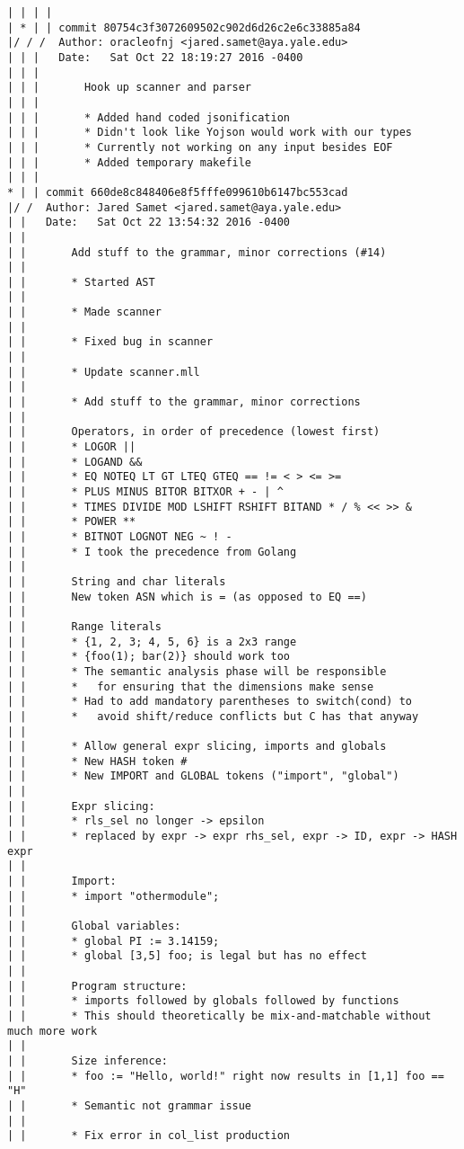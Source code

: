 \begin{lstlisting}
| | | |     
| * | | commit 80754c3f3072609502c902d6d26c2e6c33885a84
|/ / /  Author: oracleofnj <jared.samet@aya.yale.edu>
| | |   Date:   Sat Oct 22 18:19:27 2016 -0400
| | |   
| | |       Hook up scanner and parser
| | |       
| | |       * Added hand coded jsonification
| | |       * Didn't look like Yojson would work with our types
| | |       * Currently not working on any input besides EOF
| | |       * Added temporary makefile
| | |    
* | | commit 660de8c848406e8f5fffe099610b6147bc553cad
|/ /  Author: Jared Samet <jared.samet@aya.yale.edu>
| |   Date:   Sat Oct 22 13:54:32 2016 -0400
| |   
| |       Add stuff to the grammar, minor corrections (#14)
| |       
| |       * Started AST
| |       
| |       * Made scanner
| |       
| |       * Fixed bug in scanner
| |       
| |       * Update scanner.mll
| |       
| |       * Add stuff to the grammar, minor corrections
| |       
| |       Operators, in order of precedence (lowest first)
| |       * LOGOR ||
| |       * LOGAND &&
| |       * EQ NOTEQ LT GT LTEQ GTEQ == != < > <= >=
| |       * PLUS MINUS BITOR BITXOR + - | ^
| |       * TIMES DIVIDE MOD LSHIFT RSHIFT BITAND * / % << >> &
| |       * POWER **
| |       * BITNOT LOGNOT NEG ~ ! -
| |       * I took the precedence from Golang
| |       
| |       String and char literals
| |       New token ASN which is = (as opposed to EQ ==)
| |       
| |       Range literals
| |       * {1, 2, 3; 4, 5, 6} is a 2x3 range
| |       * {foo(1); bar(2)} should work too
| |       * The semantic analysis phase will be responsible
| |       *   for ensuring that the dimensions make sense
| |       * Had to add mandatory parentheses to switch(cond) to
| |       *   avoid shift/reduce conflicts but C has that anyway
| |       
| |       * Allow general expr slicing, imports and globals
| |       * New HASH token #
| |       * New IMPORT and GLOBAL tokens ("import", "global")
| |       
| |       Expr slicing:
| |       * rls_sel no longer -> epsilon
| |       * replaced by expr -> expr rhs_sel, expr -> ID, expr -> HASH expr
| |       
| |       Import:
| |       * import "othermodule";
| |       
| |       Global variables:
| |       * global PI := 3.14159;
| |       * global [3,5] foo; is legal but has no effect
| |       
| |       Program structure:
| |       * imports followed by globals followed by functions
| |       * This should theoretically be mix-and-matchable without much more work
| |       
| |       Size inference:
| |       * foo := "Hello, world!" right now results in [1,1] foo == "H"
| |       * Semantic not grammar issue
| |       
| |       * Fix error in col_list production

\end{lstlisting}
